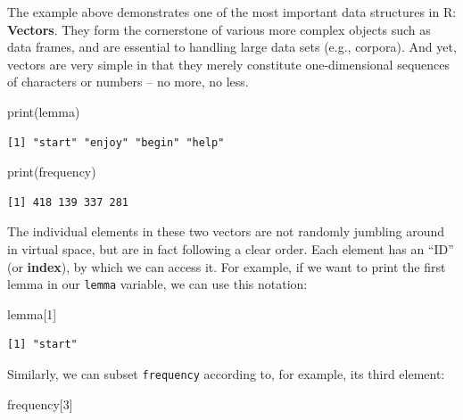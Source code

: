 \documentclass[
  11pt,
  letterpaper,
  DIV=11,
  numbers=noendperiod]{scrreprt}
\newenvironment{Shaded}{\begin{snugshade}}{\end{snugshade}}
\newcommand{\DecValTok}[1]{\textcolor[rgb]{0.68,0.00,0.00}{#1}}
\newcommand{\FunctionTok}[1]{\textcolor[rgb]{0.28,0.35,0.67}{#1}}
\newcommand{\NormalTok}[1]{\textcolor[rgb]{0.00,0.23,0.31}{#1}}
\begin{document}
The example above demonstrates one of the most important data structures
in R: \textbf{Vectors}. They form the cornerstone of various more
complex objects such as data frames, and are essential to handling large
data sets (e.g., corpora). And yet, vectors are very simple in that they
merely constitute one-dimensional sequences of characters or numbers --
no more, no less.

\begin{Shaded}
\begin{Highlighting}[]
\FunctionTok{print}\NormalTok{(lemma)}
\end{Highlighting}
\end{Shaded}

\begin{verbatim}
[1] "start" "enjoy" "begin" "help" 
\end{verbatim}

\begin{Shaded}
\begin{Highlighting}[]
\FunctionTok{print}\NormalTok{(frequency)}
\end{Highlighting}
\end{Shaded}

\begin{verbatim}
[1] 418 139 337 281
\end{verbatim}

The individual elements in these two vectors are not randomly jumbling
around in virtual space, but are in fact following a clear order. Each
element has an ``ID'' (or \textbf{index}), by which we can access it.
For example, if we want to print the first lemma in our \texttt{lemma}
variable, we can use this notation:

\begin{Shaded}
\begin{Highlighting}[]
\NormalTok{lemma[}\DecValTok{1}\NormalTok{]}
\end{Highlighting}
\end{Shaded}

\begin{verbatim}
[1] "start"
\end{verbatim}

Similarly, we can subset \texttt{frequency} according to, for example,
its third element:

\begin{Shaded}
\begin{Highlighting}[]
\NormalTok{frequency[}\DecValTok{3}\NormalTok{]}
\end{Highlighting}
\end{Shaded}
\end{document}
